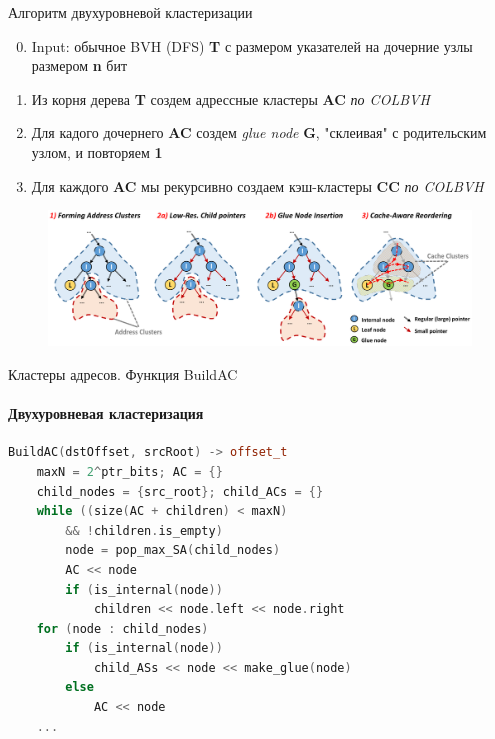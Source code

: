 \documentclass{beamer}
\begin{document}
\begin{frame}{Алгоритм двухуровневой кластеризации}
    \begin{enumerate}
        \setcounter{enumi}{-1}
        \item
            Input: обычное BVH (DFS) \textbf{T} с размером указателей на дочерние узлы размером \textbf{n} бит
        \item
            Из корня дерева \textbf{T} создем адрессные кластеры \textbf{AC} \textit{по COLBVH}
        \item
            Для кадого дочернего \textbf{AC} создем \textit{glue node} \textbf{G}, "склеивая" с родительским узлом, 
            и повторяем \textbf{1}
        \item
            Для каждого \textbf{AC} мы рекурсивно создаем кэш-кластеры \textbf{CC} \textit{по COLBVH}
    \end{enumerate}
    \begin{figure}
        \includegraphics[keepaspectratio, width=\textwidth]{res/2lvl_clustering.png}
    \end{figure}
\end{frame}

\begin{frame}[fragile]{Кластеры адресов. Функция BuildAC}
    \framesubtitle{Двухуровневая кластеризация}
    \begin{lstlisting}[language=C++,basicstyle=\ttfamily,keywordstyle=\color{blue}]
BuildAC(dstOffset, srcRoot) -> offset_t
    maxN = 2^ptr_bits; AC = {}
    child_nodes = {src_root}; child_ACs = {}
    while ((size(AC + children) < maxN)
        && !children.is_empty)
        node = pop_max_SA(child_nodes)
        AC << node
        if (is_internal(node))
            children << node.left << node.right
    for (node : child_nodes)
        if (is_internal(node))
            child_ASs << node << make_glue(node)
        else
            AC << node
    ...
    \end{lstlisting}
\end{frame}
\end{document}
